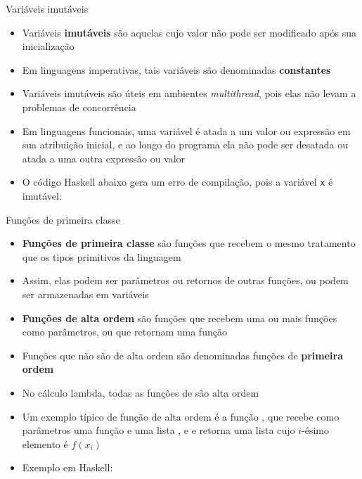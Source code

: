 \begin{frame}[fragile]{Variáveis imutáveis}

    \begin{itemize}
        \item Variáveis \textbf{imutáveis} são aquelas cujo valor não pode ser modificado após sua
            inicialização

        \item Em linguagens imperativas, tais variáveis são denominadas \textbf{constantes}

        \item Variáveis imutáveis são úteis em ambientes \textit{multithread}, pois elas não levam
            a problemas de concorrência

        \item Em linguagens funcionais, uma variável é atada a um valor ou expressão em sua
            atribuição inicial, e ao longo do programa ela não pode ser desatada ou atada a uma
            outra expressão ou valor

        \item O código Haskell abaixo gera um erro de compilação, pois a variável
            \texttt{x} é imutável:

    \end{itemize}
\end{frame}

\begin{frame}[fragile]{Funções de primeira classe}

    \begin{itemize}
        \item \textbf{Funções de primeira classe} são funções que recebem o mesmo tratamento que
            os tipos primitivos da linguagem

        \item Assim, elas podem ser parâmetros ou retornos de outras funções, ou podem ser
            armazenadas em variáveis

        \item \textbf{Funções de alta ordem} são funções que recebem uma ou mais funções como
            parâmetros, ou que retornam uma função

        \item Funções que não são de alta ordem são denominadas funções de \textbf{primeira ordem}

        \item No cálculo lambda, todas as funções de são alta ordem

        \item Um exemplo típico de função de alta ordem é a função , que 
            recebe como parâmetros uma função  e uma lista ,
            e e retorna uma lista cujo $i$-ésimo elemento é $f(x_i)$

        \item Exemplo em Haskell:
    \end{itemize}

\end{frame}

